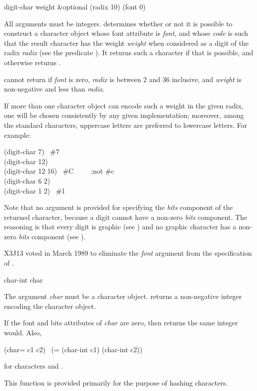 \begin{defun}[Function]
digit-char weight &optional (radix 10) (font 0)

All arguments must be integers.  
determines whether or not it is possible to construct
a character object
whose font attribute is \emph{font}, and whose \emph{code} is such that the
result character has the weight \emph{weight} when considered as
a digit of the radix \emph{radix} (see the predicate ).
It returns such a character if that is possible, and otherwise returns {\false}.

 cannot return {\false} if \emph{font} is zero,
\emph{radix} is between 2 and 36 inclusive, and \emph{weight} is non-negative
and less than \emph{radix}.

If more than one character object can encode
such a weight in the given radix, one will be chosen consistently
by any given implementation; moreover, among the standard characters,
uppercase letters are preferred to lowercase letters.
For example:
\begin{lisp}
(digit-char 7) \EV\ \#{\Xbackslash}7 \\
(digit-char 12) \EV\ {\false} \\
(digit-char 12 16) \EV\ \#{\Xbackslash}C~~~~~;\textrm{not} \#{\Xbackslash}c \\
(digit-char 6 2) \EV\ {\false} \\
(digit-char 1 2) \EV\ \#{\Xbackslash}1
\end{lisp}
Note that no argument is provided for specifying the \emph{bits} component
of the returned character, because a digit cannot have a non-zero
\emph{bits} component.  The reasoning is that every digit is graphic
(see ) and no graphic character has a non-zero
\emph{bits} component (see ).

\begin{newer}
X3J13 voted in March 1989 
to eliminate the \emph{font} argument from the specification of .
\end{newer}
\end{defun}

\begin{defun}[Function]
char-int char

The argument \emph{char} must be a character object.
 returns a non-negative integer encoding the character object.

If the font and bits attributes of \emph{char} are zero, then
 returns the same integer  would.
Also,
\begin{lisp}
(char= c1 c2) \EQ\ (= (char-int c1) (char-int c2))
\end{lisp}
for characters  and .

This function is provided primarily for the purpose of hashing characters.
\end{defun}

